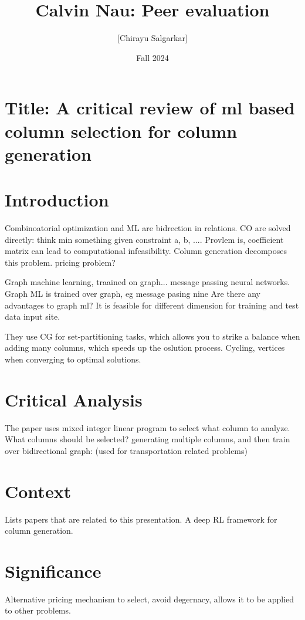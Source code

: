 \documentclass[10pt, oneside]{article}
\title{Calvin Nau: Peer evaluation}
\author{[Chirayu Salgarkar]}
\date{Fall 2024}
\begin{document}
\maketitle
\tableofcontents

\vspace{.25in}

\section{Title: A critical review of ml based column selection for column generation}
\section{Introduction}

Combinoatorial optimization and ML are bidrection in relations. CO are solved directly: think min something given constraint a, b, .... Provlem is, coefficient matrix can lead to computational infeasibility. Column generation decomposes this problem. pricing problem?

Graph machine learning, traained on graph... message passing neural networks. Graph ML is trained over graph, eg message pasing nine
Are there any advantages to graph ml? It is feasible for different dimension for training and test data input site. 

They use CG for set-partitioning tasks, which allows you to strike a balance when adding many columns, which speeds up the oslution process. Cycling, vertices when converging to optimal solutions. 
\section{Critical Analysis}
The paper uses mixed integer linear program to select what column to analyze. What columns should be selected? generating multiple columns, and then train over bidirectional graph: (used for transportation related problems)

\section{Context}
Lists papers that are related to this presentation.
A deep RL framework for column generation. 

\section{Significance }
Alternative pricing mechanism to select, avoid degernacy, allows it to be applied to other problems.
\end{document}
